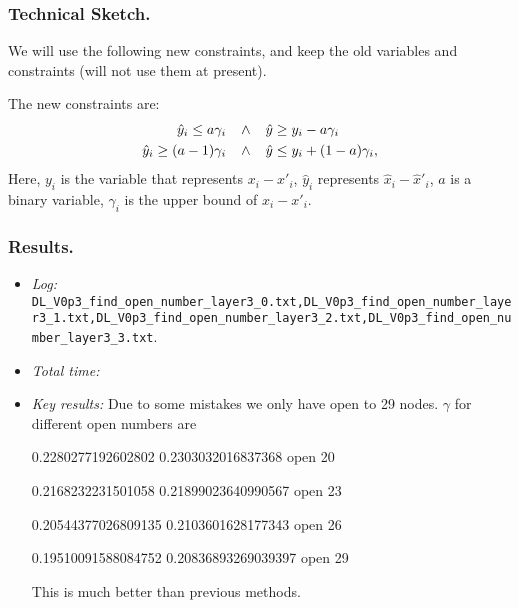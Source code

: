 \documentclass{llncs}
\begin{document}
\subsubsection*{Technical Sketch.}

We will use the following new constraints, and keep the old variables and constraints (will not use them at present).

The new constraints are: \begin{align*}
	\hat{y}_i \leq a \gamma_i \hspace*{2ex} &\wedge \hspace*{2ex}\hat{y} \geq y_i - a \gamma_i\\
	\hat{y}_i \geq (a-1) \gamma_i  \hspace*{2ex} &\wedge \hspace*{2ex} \hat{y} \leq y_i + (1-a) \gamma_i,
\end{align*} Here, $y_i$ is the variable that represents $x_i-x'_i$, $\hat{y}_i$ represents $\hat{x}_i-\hat{x}'_i$, $a$ is a binary variable, $\gamma_i$ is the upper bound of $x_i-x'_i$.



\subsubsection*{Results.}

\begin{itemize}
	\item \emph{Log:} \verb*|DL_V0p3_find_open_number_layer3_0.txt,DL_V0p3_find_open_number_layer3_1.txt,DL_V0p3_find_open_number_layer3_2.txt,DL_V0p3_find_open_number_layer3_3.txt|.
	
	\item \emph{Total time:} 
	
	\item \emph{Key results:} Due to some mistakes we only have open to 29 nodes. $\gamma$ for different open numbers are 
	
	0.2280277192602802          0.2303032016837368         open 20
	
	0.2168232231501058          0.21899023640990567      open 23
	
	0.20544377026809135        0.2103601628177343        open 26
	
     0.19510091588084752   0.20836893269039397   open 29
	
	 This is much better than previous methods.
	
\end{itemize}
\end{document}
